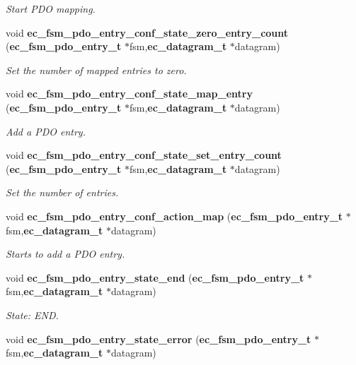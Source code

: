 \begin{DoxyCompactItemize}
\begin{DoxyCompactList}\small\item\em Start P\-D\-O mapping. \end{DoxyCompactList}\item 
void {\bf ec\-\_\-fsm\-\_\-pdo\-\_\-entry\-\_\-conf\-\_\-state\-\_\-zero\-\_\-entry\-\_\-count} ({\bf ec\-\_\-fsm\-\_\-pdo\-\_\-entry\-\_\-t} $\ast$fsm,{\bf ec\-\_\-datagram\-\_\-t} $\ast$datagram)
\begin{DoxyCompactList}\small\item\em Set the number of mapped entries to zero. \end{DoxyCompactList}\item 
void {\bf ec\-\_\-fsm\-\_\-pdo\-\_\-entry\-\_\-conf\-\_\-state\-\_\-map\-\_\-entry} ({\bf ec\-\_\-fsm\-\_\-pdo\-\_\-entry\-\_\-t} $\ast$fsm,{\bf ec\-\_\-datagram\-\_\-t} $\ast$datagram)
\begin{DoxyCompactList}\small\item\em Add a P\-D\-O entry. \end{DoxyCompactList}\item 
void {\bf ec\-\_\-fsm\-\_\-pdo\-\_\-entry\-\_\-conf\-\_\-state\-\_\-set\-\_\-entry\-\_\-count} ({\bf ec\-\_\-fsm\-\_\-pdo\-\_\-entry\-\_\-t} $\ast$fsm,{\bf ec\-\_\-datagram\-\_\-t} $\ast$datagram)
\begin{DoxyCompactList}\small\item\em Set the number of entries. \end{DoxyCompactList}\item 
void {\bf ec\-\_\-fsm\-\_\-pdo\-\_\-entry\-\_\-conf\-\_\-action\-\_\-map} ({\bf ec\-\_\-fsm\-\_\-pdo\-\_\-entry\-\_\-t} $\ast$fsm,{\bf ec\-\_\-datagram\-\_\-t} $\ast$datagram)
\begin{DoxyCompactList}\small\item\em Starts to add a P\-D\-O entry. \end{DoxyCompactList}\item 
void {\bf ec\-\_\-fsm\-\_\-pdo\-\_\-entry\-\_\-state\-\_\-end} ({\bf ec\-\_\-fsm\-\_\-pdo\-\_\-entry\-\_\-t} $\ast$fsm,{\bf ec\-\_\-datagram\-\_\-t} $\ast$datagram)
\begin{DoxyCompactList}\small\item\em State\-: E\-N\-D. \end{DoxyCompactList}\item 
void {\bf ec\-\_\-fsm\-\_\-pdo\-\_\-entry\-\_\-state\-\_\-error} ({\bf ec\-\_\-fsm\-\_\-pdo\-\_\-entry\-\_\-t} $\ast$fsm,{\bf ec\-\_\-datagram\-\_\-t} $\ast$datagram)

\end{DoxyCompactItemize}
